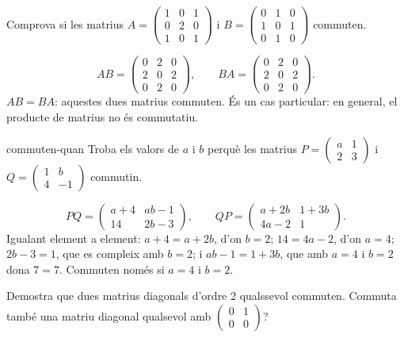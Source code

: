 \begin{apartats}

Comprova si les matrius
$A=\begin{pmatrix}1&0&1\\0&2&0\\1&0&1\end{pmatrix}$ i
$B=\begin{pmatrix}0&1&0\\1&0&1\\0&1&0\end{pmatrix}$ commuten.

\begin{solucio}
\[
AB=\begin{pmatrix}0&2&0\\2&0&2\\0&2&0\end{pmatrix},\qquad
BA=\begin{pmatrix}0&2&0\\2&0&2\\0&2&0\end{pmatrix}.
\]
$AB=BA$: aquestes dues matrius commuten. És un cas particular: en general, el producte de matrius no és
commutatiu.
\end{solucio}

\begin{tria}{commuten-quan}
Troba els valors de $a$ i $b$ perquè les matrius
$P=\begin{pmatrix}a&1\\2&3\end{pmatrix}$ i $Q=\begin{pmatrix}1&b\\4&-1\end{pmatrix}$ commutin.

\begin{solucio}
\[
PQ=\begin{pmatrix}a+4&ab-1\\14&2b-3\end{pmatrix},\qquad
QP=\begin{pmatrix}a+2b&1+3b\\4a-2&1\end{pmatrix}.
\]
Igualant element a element: $a+4=a+2b$, d'on $b=2$; $14=4a-2$, d'on $a=4$; $2b-3=1$, que es compleix
amb $b=2$; i $ab-1=1+3b$, que amb $a=4$ i $b=2$ dona $7=7$. Commuten només si $a=4$ i $b=2$.
\end{solucio}

Demostra que dues matrius diagonals d'ordre 2 qualssevol commuten. Commuta també una matriu diagonal
qualsevol amb $\begin{pmatrix}0&1\\0&0\end{pmatrix}$?


\end{tria}
\end{apartats}
